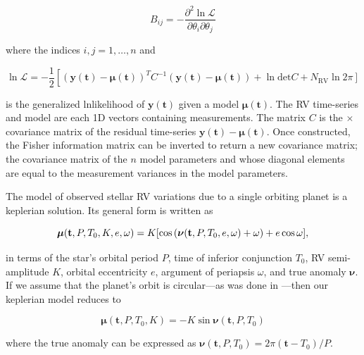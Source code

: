 \begin{equation}
  B_{ij} = - \frac{\partial^2 \ln{\mathcal{L}}}{\partial \theta_i \partial \theta_j}
  \label{RVFCeq:fisher}
\end{equation}

\noindent where the indices $i,j=1,\dots,n$ and

\begin{equation}
  \ln{\mathcal{L}} = -\frac{1}{2} \left[(\mathbf{y}(\mathbf{t})-\boldsymbol{\mu}(\mathbf{t}))^T C^{-1} \right.
    (\mathbf{y}(\mathbf{t})-\boldsymbol{\mu}(\mathbf{t})) + \ln{\text{det} C}
    + \left.N_{\text{RV}} \ln{2\pi} \right]
  \label{RVFCeq:lnl}
\end{equation}
  
\noindent is the generalized lnlikelihood of $\mathbf{y}(\mathbf{t})$ given a model
$\boldsymbol{\mu}(\mathbf{t})$. The RV time-series and model are each 1D vectors containing
\nrv{} measurements. The matrix $C$ is the \nrv{} $\times$ \nrv{} covariance matrix of the residual
time-series $\mathbf{y}(\mathbf{t})-\boldsymbol{\mu}(\mathbf{t})$. Once constructed,
the Fisher information matrix can be inverted to return a new covariance matrix; the covariance matrix
of the $n$ model parameters and whose diagonal elements are equal to the measurement variances in the
model parameters.

The model of observed stellar RV variations due to a single orbiting planet is a
keplerian solution. Its general form is written as

\begin{equation}
  \boldsymbol{\mu}(\mathbf{t},P,T_0,K,e,\omega) = K [\cos{(\boldsymbol{\nu}(\mathbf{t},P,T_0,e,\omega)+\omega)} \\
    + e\cos{\omega}],
\end{equation}

\noindent in terms of the star's orbital period $P$, time of inferior conjunction $T_0$,
RV semi-amplitude $K$, orbital eccentricity $e$, argument of periapsis $\omega$, and true anomaly
$\boldsymbol{\nu}$. If we assume that the planet's orbit is circular---as was done in ---then
our keplerian model reduces to

\begin{equation}
  \boldsymbol{\mu}(\mathbf{t},P,T_0,K) = -K \sin{\boldsymbol{\nu}(\mathbf{t},P,T_0)}
  \label{RVFCeq:kep}
\end{equation}

\noindent where the true anomaly can be expressed as $\boldsymbol{\nu}(\mathbf{t},P,T_0) =2\pi(\mathbf{t}-T_0)/P$.

